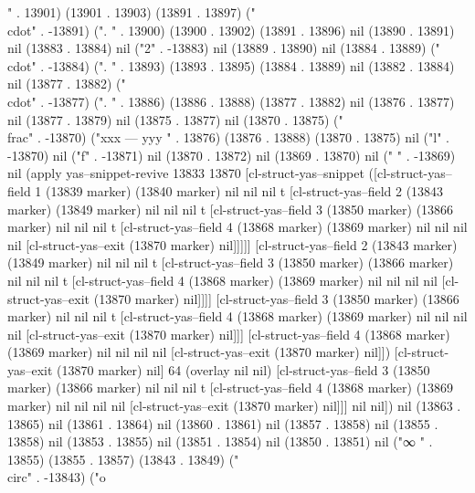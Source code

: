 {" . 13901) (13901 . 13903) (13891 . 13897) ("\\cdot" . -13891) (".
" . 13900) (13900 . 13902) (13891 . 13896) nil (13890 . 13891) nil (13883 . 13884) nil ("2" . -13883) nil (13889 . 13890) nil (13884 . 13889) ("\\cdot" . -13884) (".
" . 13893) (13893 . 13895) (13884 . 13889) nil (13882 . 13884) nil (13877 . 13882) ("\\cdot" . -13877) (".
" . 13886) (13886 . 13888) (13877 . 13882) nil (13876 . 13877) nil (13877 . 13879) nil (13875 . 13877) nil (13870 . 13875) ("\\frac" . -13870) ("xxx
---
yyy
" . 13876) (13876 . 13888) (13870 . 13875) nil ("l" . -13870) nil ("f" . -13871) nil (13870 . 13872) nil (13869 . 13870) nil (" " . -13869) nil (apply yas--snippet-revive 13833 13870 [cl-struct-yas--snippet ([cl-struct-yas--field 1 (13839 marker) (13840 marker) nil nil nil t [cl-struct-yas--field 2 (13843 marker) (13849 marker) nil nil nil t [cl-struct-yas--field 3 (13850 marker) (13866 marker) nil nil nil t [cl-struct-yas--field 4 (13868 marker) (13869 marker) nil nil nil nil [cl-struct-yas--exit (13870 marker) nil]]]]] [cl-struct-yas--field 2 (13843 marker) (13849 marker) nil nil nil t [cl-struct-yas--field 3 (13850 marker) (13866 marker) nil nil nil t [cl-struct-yas--field 4 (13868 marker) (13869 marker) nil nil nil nil [cl-struct-yas--exit (13870 marker) nil]]]] [cl-struct-yas--field 3 (13850 marker) (13866 marker) nil nil nil t [cl-struct-yas--field 4 (13868 marker) (13869 marker) nil nil nil nil [cl-struct-yas--exit (13870 marker) nil]]] [cl-struct-yas--field 4 (13868 marker) (13869 marker) nil nil nil nil [cl-struct-yas--exit (13870 marker) nil]]) [cl-struct-yas--exit (13870 marker) nil] 64 (overlay nil nil) [cl-struct-yas--field 3 (13850 marker) (13866 marker) nil nil nil t [cl-struct-yas--field 4 (13868 marker) (13869 marker) nil nil nil nil [cl-struct-yas--exit (13870 marker) nil]]] nil nil]) nil (13863 . 13865) nil (13861 . 13864) nil (13860 . 13861) nil (13857 . 13858) nil (13855 . 13858) nil (13853 . 13855) nil (13851 . 13854) nil (13850 . 13851) nil ("∞
" . 13855) (13855 . 13857) (13843 . 13849) ("\\circ" . -13843) ("o
}
